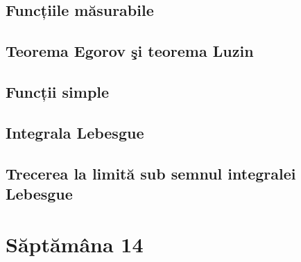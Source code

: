 \documentclass[a4paper,12pt]{article}
\theoremstyle{change}
\begin{document}

\subsection{Funcțiile măsurabile}

\subsection{Teorema Egorov şi teorema Luzin}


\subsection{Funcții simple}

\subsection{Integrala Lebesgue}


\subsection{Trecerea la limită sub semnul integralei Lebesgue}

\section{Săptămâna 14}
\end{document}
